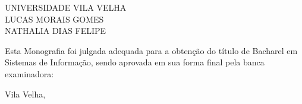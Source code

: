 ﻿%

%
% 
%
\begin{folhadeaprovacao}


\begin{center}


            {UNIVERSIDADE VILA VELHA} \\
           

    \vspace{1.5cm}
                                    {LUCAS MORAIS GOMES \\ NATHALIA DIAS FELIPE}\\
    \bfseries{}
\end{center}

Esta Monografia foi julgada adequada para a obten\c{c}\~{a}o do título  de Bacharel em Sistemas de Informação, sendo aprovada em sua forma final  pela banca examinadora:

    \vspace{2.5cm}
    \vfill

    \begin{center}
        Vila Velha, \the\year{}
    \end{center}
  
\end{folhadeaprovacao}